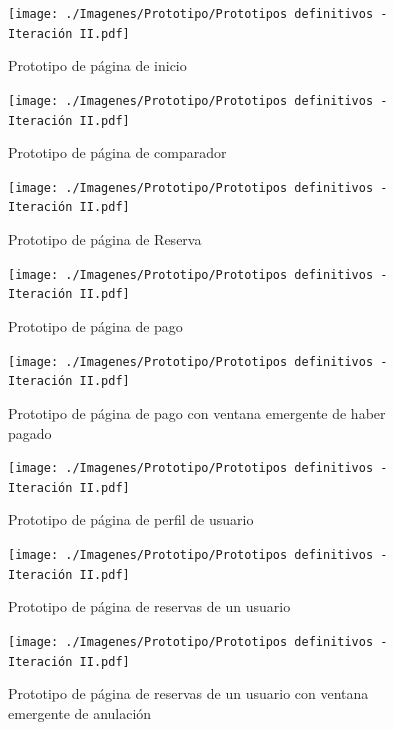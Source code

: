 \begin{figure}[H]
    \centering
    \texttt{[image: ./Imagenes/Prototipo/Prototipos definitivos - Iteración II.pdf]}
    \caption{Prototipo de página de inicio}
    \label{fig:prot2_inicio}
\end{figure}

\begin{figure}[H]
    \centering
    \texttt{[image: ./Imagenes/Prototipo/Prototipos definitivos - Iteración II.pdf]}
    \caption{Prototipo de página de comparador}
    \label{fig:prot2_comp}
\end{figure}

\begin{figure}[H]
    \centering
    \texttt{[image: ./Imagenes/Prototipo/Prototipos definitivos - Iteración II.pdf]}
    \caption{Prototipo de página de Reserva}
    \label{fig:prot2_reser}
\end{figure}

\begin{figure}[H]
    \centering
    \texttt{[image: ./Imagenes/Prototipo/Prototipos definitivos - Iteración II.pdf]}
    \caption{Prototipo de página de pago}
    \label{fig:prot2_pago}
\end{figure}

\begin{figure}[H]
    \centering
    \texttt{[image: ./Imagenes/Prototipo/Prototipos definitivos - Iteración II.pdf]}
    \caption{Prototipo de página de pago con ventana emergente de haber pagado}
    \label{fig:prot2_pago_popup}
\end{figure}

\begin{figure}[H]
    \centering
    \texttt{[image: ./Imagenes/Prototipo/Prototipos definitivos - Iteración II.pdf]}
    \caption{Prototipo de página de perfil de usuario}
    \label{fig:prot2_perfil}
\end{figure}

\begin{figure}[H]
    \centering
    \texttt{[image: ./Imagenes/Prototipo/Prototipos definitivos - Iteración II.pdf]}
    \caption{Prototipo de página de reservas de un usuario}
    \label{fig:prot2_reservas_usuario}
\end{figure}

\begin{figure}[H]
    \centering
    \texttt{[image: ./Imagenes/Prototipo/Prototipos definitivos - Iteración II.pdf]}
    \caption{Prototipo de página de reservas de un usuario con ventana emergente de anulación}
    \label{fig:prot2_reservas_usuario_popup}
\end{figure}

